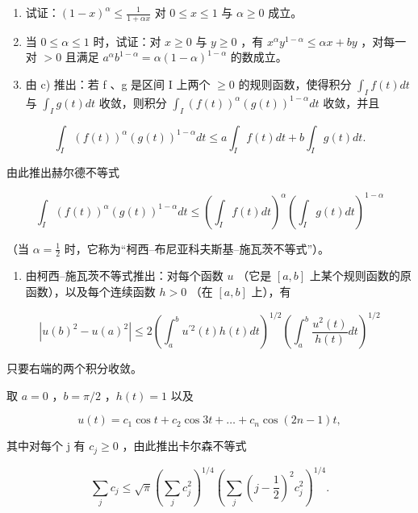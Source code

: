 \begin{enumerate}
\def\labelenumi{\alph{enumi})}
\setcounter{enumi}{1}
\item
  试证：\((1 - x)^{\alpha} \leqslant \frac{1}{1 + \alpha x}\) 对 \(0 \leqslant x \leqslant 1\) 与 \(\alpha \geqslant 0\) 成立。
\item
  当 \(0 \leqslant \alpha \leqslant 1\) 时，试证：对 \(x \geqslant 0\) 与 \(y \geqslant 0\) ，有 \(x^{\alpha} y^{1 - \alpha} \leqslant \alpha x + by\) ，对每一对 \(>0\) 且满足 \(a^{\alpha} b^{1 - \alpha} = \alpha (1 - \alpha)^{1 - \alpha}\) 的数成立。
\item
  由 c) 推出：若 f 、g 是区间 I 上两个 \(\geqslant 0\) 的规则函数，使得积分 \(\int_{I} f(t) dt\) 与 \(\int_{I} g(t) dt\) 收敛，则积分 \(\int_{I} (f(t))^{\alpha}(g(t))^{1-\alpha} dt\) 收敛，并且
\end{enumerate}

\[
\int_ {I} (f (t)) ^ {\alpha} (g (t)) ^ {1 - \alpha} d t \leqslant a \int_ {I} f (t) d t + b \int_ {I} g (t) d t.
\]

由此推出赫尔德不等式

\[
\int_ {I} (f (t)) ^ {\alpha} (g (t)) ^ {1 - \alpha} d t \leqslant \left(\int_ {I} f (t) d t\right) ^ {\alpha} \left(\int_ {I} g (t) d t\right) ^ {1 - \alpha}
\]

（当 \(\alpha = \frac{1}{2}\) 时，它称为“柯西–布尼亚科夫斯基–施瓦茨不等式”）。

\begin{enumerate}
\def\labelenumi{\arabic{enumi})}
\setcounter{enumi}{3}
\tightlist
\item
  由柯西–施瓦茨不等式推出：对每个函数 \(u\) （它是 \([a, b]\) 上某个规则函数的原函数），以及每个连续函数 \(h > 0\) （在 \([a, b]\) 上），有
\end{enumerate}

\[
\left| u (b) ^ {2} - u (a) ^ {2} \right| \leqslant 2 \left(\int_ {a} ^ {b} u ^ {\prime 2} (t) h (t) d t\right) ^ {1 / 2} \left(\int_ {a} ^ {b} \frac {u ^ {2} (t)}{h (t)} d t\right) ^ {1 / 2}
\]

只要右端的两个积分收敛。

取 \(a = 0\) ，\(b = \pi / 2\) ，\(h(t) = 1\) 以及

\[
u (t) = c _ {1} \cos t + c _ {2} \cos 3 t + \dots + c _ {n} \cos (2 n - 1) t,
\]

其中对每个 j 有 \(c_{j} \geqslant 0\) ，由此推出卡尔森不等式

\[
\sum_ {j} c _ {j} \leqslant \sqrt {\pi} \left(\sum_ {j} c _ {j} ^ {2}\right) ^ {1 / 4} \left(\sum_ {j} \left(j - \frac {1}{2}\right) ^ {2} c _ {j} ^ {2}\right) ^ {1 / 4}.
\]

